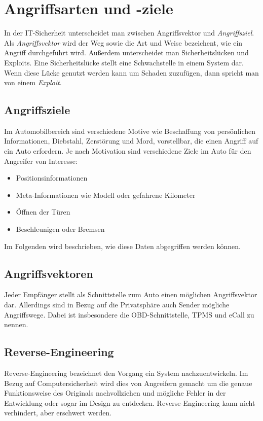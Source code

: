 \section{Angriffsarten und -ziele}\label{sec:attack}

In der IT-Sicherheit unterscheidet man zwischen Angriffsvektor und
\textit{Angriffsziel}. Als \textit{Angriffsvektor} wird der Weg sowie die Art
und Weise bezeichent, wie ein Angriff durchgeführt wird\cite{Sambleben2012,Metasploit2012}.
Außerdem unterscheidet man Sicherheitslücken und Exploits. Eine
Sicherheitslücke stellt eine Schwachstelle in einem System dar. Wenn diese
Lücke genutzt werden kann um Schaden zuzufügen, dann spricht man von einem
\textit{Exploit}.


\subsection{Angriffsziele}
Im Automobilbereich sind verschiedene Motive wie Beschaffung von persönlichen
Informationen, Diebstahl, Zerstörung und Mord, vorstellbar, die einen Angriff
auf ein Auto erfordern. Je nach Motivation sind verschiedene Ziele im Auto für
den Angreifer von Interesse:

\begin{itemize}
    \item Positionsinformationen
    \item Meta-Informationen wie Modell oder gefahrene Kilometer
    \item Öffnen der Türen
    \item Beschleunigen oder Bremsen
\end{itemize}

Im Folgenden wird beschrieben, wie diese Daten abgegriffen werden können.


\subsection{Angriffsvektoren}
Jeder Empfänger stellt als Schnittstelle zum Auto einen möglichen
Angriffsvektor dar. Allerdings sind in Bezug auf die Privatsphäre auch Sender
mögliche Angriffswege. Dabei ist insbesondere die OBD-Schnittstelle, TPMS und
eCall zu nennen.

\subsection{Reverse-Engineering}
Reverse-Engineering bezeichnet den Vorgang ein System nachzuentwickeln. Im
Bezug auf Computersicherheit wird dies von Angreifern gemacht um die genaue
Funktionsweise des Originals nachvollziehen und mögliche Fehler in der
Entwicklung oder sogar im Design zu entdecken. Reverse-Engineering kann nicht
verhindert, aber erschwert werden.

